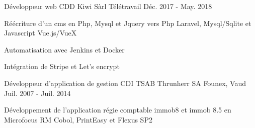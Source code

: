 

\begin{cventries}

  \cventry
    {Développeur web CDD} %
    {Kiwi Sàrl} %
    {Télétravail} %
    {Déc. 2017 - May. 2018} %
    {
      \begin{cvitems} %
        \item {Réécriture d'un cms en Php, Mysql et Jquery vers Php Laravel, Mysql/Sqlite et Javascript Vue.js/VueX}
        \item {Automatisation avec Jenkins et Docker}
        \item {Intégration de Stripe et Let's encrypt}
      \end{cvitems}
    }

  \cventry
    {Développeur d'application de gestion CDI} %
    {TSAB Thrunherr SA} %
    {Founex, Vaud} %
    {Juil. 2007 - Juil. 2014} %
    {
      \begin{cvitems} %
        \item {Développement de l'application régie comptable immob8 et immob 8.5 en Microfocus RM Cobol, PrintEasy et Flexus SP2}
      \end{cvitems}
    }

\end{cventries}
